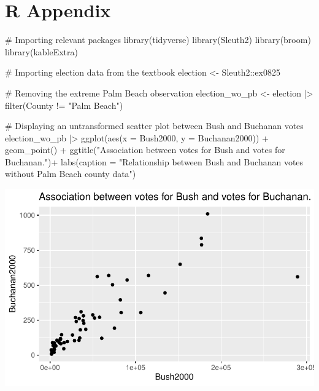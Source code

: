 \documentclass[
  letterpaper,
  DIV=11,
  numbers=noendperiod]{scrartcl}
\newenvironment{Shaded}{\begin{snugshade}}{\end{snugshade}}
\newcommand{\AttributeTok}[1]{\textcolor[rgb]{0.40,0.45,0.13}{#1}}
\newcommand{\CommentTok}[1]{\textcolor[rgb]{0.37,0.37,0.37}{#1}}
\newcommand{\FunctionTok}[1]{\textcolor[rgb]{0.28,0.35,0.67}{#1}}
\newcommand{\NormalTok}[1]{\textcolor[rgb]{0.00,0.23,0.31}{#1}}
\newcommand{\OtherTok}[1]{\textcolor[rgb]{0.00,0.23,0.31}{#1}}
\newcommand{\SpecialCharTok}[1]{\textcolor[rgb]{0.37,0.37,0.37}{#1}}
\newcommand{\StringTok}[1]{\textcolor[rgb]{0.13,0.47,0.30}{#1}}
\begin{document}
\section{R Appendix}\label{r-appendix}

\begin{Shaded}
\begin{Highlighting}[]
\CommentTok{\# Importing relevant packages}
\FunctionTok{library}\NormalTok{(tidyverse)}
\FunctionTok{library}\NormalTok{(Sleuth2)}
\FunctionTok{library}\NormalTok{(broom)}
\FunctionTok{library}\NormalTok{(kableExtra) }

\CommentTok{\# Importing election data from the textbook}
\NormalTok{election }\OtherTok{\textless{}{-}}\NormalTok{ Sleuth2}\SpecialCharTok{::}\NormalTok{ex0825}

\CommentTok{\# Removing the extreme Palm Beach observation}
\NormalTok{election\_wo\_pb }\OtherTok{\textless{}{-}}\NormalTok{ election }\SpecialCharTok{|\textgreater{}} \FunctionTok{filter}\NormalTok{(County }\SpecialCharTok{!=} \StringTok{"Palm Beach"}\NormalTok{)}

\CommentTok{\# Displaying an untransformed scatter plot between Bush and Buchanan votes}
\NormalTok{election\_wo\_pb }\SpecialCharTok{|\textgreater{}} \FunctionTok{ggplot}\NormalTok{(}\FunctionTok{aes}\NormalTok{(}\AttributeTok{x =}\NormalTok{ Bush2000, }\AttributeTok{y =}\NormalTok{ Buchanan2000)) }\SpecialCharTok{+} \FunctionTok{geom\_point}\NormalTok{() }\SpecialCharTok{+} \FunctionTok{ggtitle}\NormalTok{(}\StringTok{"Association between votes for Bush and votes for Buchanan."}\NormalTok{)}\SpecialCharTok{+} \FunctionTok{labs}\NormalTok{(}\AttributeTok{caption =} \StringTok{"Relationship between Bush and Buchanan votes without Palm Beach county data"}\NormalTok{)}
\end{Highlighting}
\end{Shaded}

\includegraphics{case_study_1_files/figure-pdf/unnamed-chunk-6-1.pdf}
\end{document}
